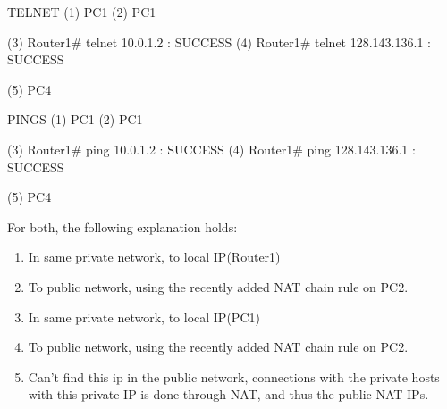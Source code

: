 TELNET
(1) PC1%
(2) PC1%

(3) Router1# telnet 10.0.1.2		: SUCCESS
(4) Router1# telnet 128.143.136.1	: SUCCESS

(5) PC4%

PINGS
(1) PC1%
(2) PC1%

(3) Router1# ping 10.0.1.2		: SUCCESS
(4) Router1# ping 128.143.136.1		: SUCCESS

(5) PC4%

For both, the following explanation holds:
\begin{enumerate}
\item In same private network, to local IP(Router1)
\item To public network, using the recently added NAT chain rule on PC2.
\item In same private network, to local IP(PC1)
\item To public network, using the recently added NAT chain rule on PC2.
\item Can't find this ip in the public network, connections with the private hosts with this private IP is done through NAT, and thus the public NAT IPs.
\end{enumerate}